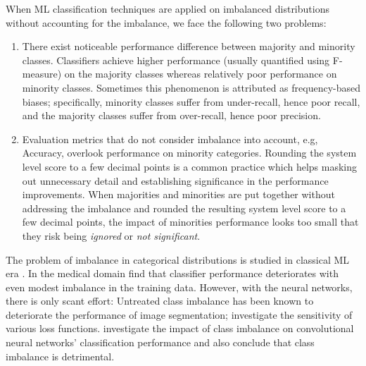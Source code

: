 When ML classification techniques are applied on imbalanced distributions without accounting for the imbalance, we face the following two problems:
\begin{enumerate}
\item There exist noticeable performance difference between majority and minority classes. 
Classifiers achieve higher performance (usually quantified using F-measure) on the majority classes whereas relatively poor performance on minority classes. 
Sometimes this phenomenon is attributed as frequency-based biases; specifically, minority classes suffer from under-recall, hence poor recall, and the majority classes suffer from over-recall, hence poor precision.

\item Evaluation metrics that do not consider imbalance into account, e.g, Accuracy, overlook performance on minority categories. 
Rounding the system level score to a few decimal points is a common practice which helps masking out unnecessary detail and establishing significance in the performance improvements. 
When majorities and minorities are put together without addressing the imbalance and rounded the resulting system level score to a few decimal points, the impact of minorities performance looks too small that they risk being \textit{ignored} or \textit{not significant}.
\end{enumerate}


The problem of imbalance in categorical distributions is studied in classical ML era \cite{provost2000-ml-imb-101, japkowicz2002ClassImbalance,chawla-etal-2004-special-issue}.
In the medical domain \citet{Maciej2008MedicalImbalance} find that classifier performance deteriorates with even modest imbalance in the training data.
However, with the neural networks, there is only scant effort:
Untreated class imbalance has been known to deteriorate the performance of image segmentation; 
\citet{Sudre2017GeneralizedDice} investigate the sensitivity of various loss functions.
\citet{buda-etal-2018-imbalance-cnn} investigate the impact of class imbalance on convolutional neural networks' classification performance and also conclude that class imbalance is detrimental. %


